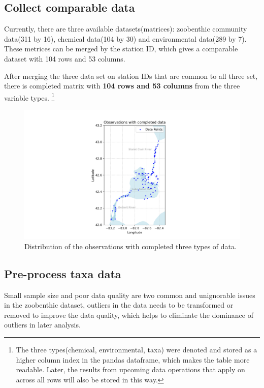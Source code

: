 \subsection{Collect comparable data}

Currently, there are three available datasets(matrices): zoobenthic community data(311 by 16),
chemical data(104 by 30) and environmental data(289 by 7).
These metrices can be merged by the station ID, which gives a comparable dataset with 104 rows
and 53 columns. 

After merging the three data set on station IDs that are common to all three set,
there is completed matrix with \textbf{104 rows and 53 columns} from the three variable types.
\footnote{The three types(chemical, environmental, taxa) were denoted and stored as a higher column index in the pandas dataframe,
which makes the table more readable. Later, the results from upcoming data operations that apply on 
across all rows will also be stored in this way.}

\begin{figure}
    \centering
    \includegraphics[width=\textwidth]{../results/preliminary_results/merged_104_completed_observations.png}
    \caption{Distribution of the observations with completed three types of data.}
    \label{fig:merged_104_completed_observations}
\end{figure}

\subsection{Pre-process taxa data}

Small sample size and poor data quality are two common and unignorable issues in the zoobenthic dataset,
outliers in the data needs to be transformed or removed to improve the data quality,
which helps to eliminate the dominance of outliers in later analysis.

